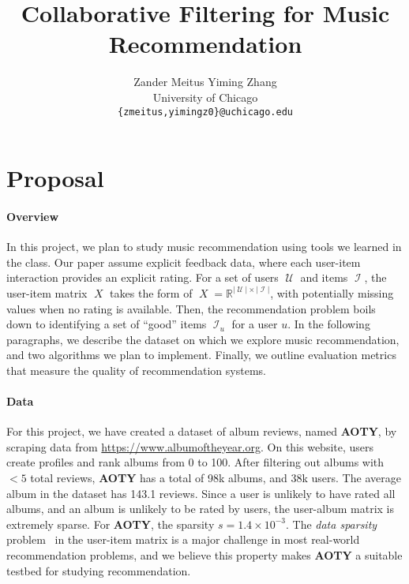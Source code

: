 \documentclass{article}
\title{Collaborative Filtering for Music Recommendation}
\author{
  Zander Meitus \qquad Yiming Zhang \\
  University of Chicago \\
  \texttt{\{zmeitus,yimingz0\}@uchicago.edu}
}
\newcommand{\aoty}{{\bf AOTY}\xspace}
\DeclareMathOperator{\X}{\mathit{X}}
\DeclareMathOperator{\U}{\mathcal{U}}
\DeclareMathOperator{\I}{\mathcal{I}}
\newcommand{\card}[1]{\ensuremath{\lvert {#1} \rvert}}
\begin{document}
\maketitle

\section{Proposal}


\paragraph{Overview}
In this project, we plan to study music recommendation using tools we learned
 in the class.
Our paper assume explicit feedback data, where each user-item interaction
 provides an explicit rating.
For a set of users $\U$ and items $\I$, the user-item matrix $\X$ takes the
 form of $\X = \mathbb{R}^{\card{\U} \times \card{\I}}$, with potentially
 missing values when no rating is available.
Then, the recommendation problem boils down to identifying a set of ``good''
 items $\I_u$ for a user $u$.
In the following paragraphs, we describe the dataset on which we explore music
 recommendation, and two algorithms we plan to implement.
Finally, we outline evaluation metrics that measure the quality of
 recommendation systems.

\paragraph*{Data}
For this project, we have created a dataset of album reviews, named \aoty, by
 scraping data from \url{https://www.albumoftheyear.org}.
On this website, users create profiles and rank albums from 0 to 100.
After filtering out albums with $<5$ total reviews, \aoty has a total of 98k
 albums, and 38k users.
The average album in the dataset has 143.1 reviews.
Since a user is unlikely to have rated all albums, and an album is unlikely to
 be rated by users, the user-album matrix is extremely sparse.
For \aoty, the sparsity $s = 1.4 \times 10^{-3}$.
The {\em data sparsity} problem~\citep{suSurveyCollaborativeFiltering2009} in
 the user-item matrix is a major challenge in most real-world recommendation
 problems, and we believe this property makes \aoty a suitable testbed for
 studying recommendation.
\end{document}
